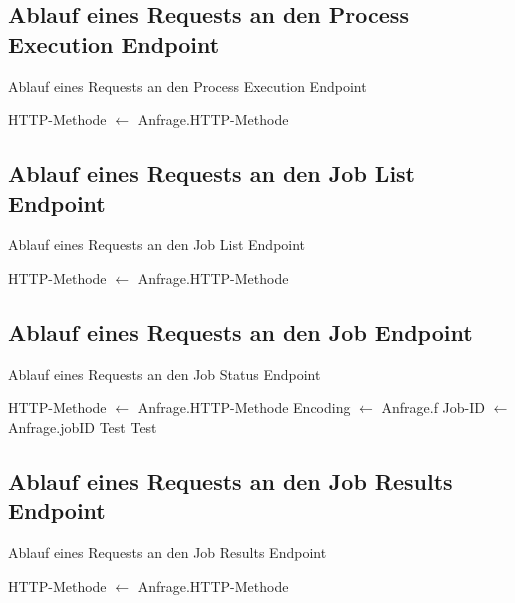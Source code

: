 \subsection{Ablauf eines Requests an den Process Execution Endpoint}
\begin{algorithm}[H]
\caption{Ablauf eines Requests an den Process Execution Endpoint}\label{PseudocodeProcessExecution}
\scriptsize
\begin{algorithmic}  
    \STATE HTTP-Methode $\gets$ Anfrage.HTTP-Methode       
\end{algorithmic}
\end{algorithm}

\subsection{Ablauf eines Requests an den Job List Endpoint}
\begin{algorithm}[H]
\scriptsize
\caption{Ablauf eines Requests an den Job List Endpoint}\label{PseudocodeJobList}
\begin{algorithmic}     
    \STATE HTTP-Methode $\gets$ Anfrage.HTTP-Methode
\end{algorithmic}
\end{algorithm}

\subsection{Ablauf eines Requests an den Job Endpoint}
\begin{algorithm}[H]
\scriptsize
\caption{Ablauf eines Requests an den Job Status Endpoint}\label{PseudocodeJobStatus}
\begin{algorithmic}     
    \STATE HTTP-Methode $\gets$ Anfrage.HTTP-Methode
    \STATE Encoding $\gets$ Anfrage.f
    \STATE Job-ID $\gets$ Anfrage.jobID
        \STATE Test
        \STATE Test
    \ELSE{}
    \ENDIF{}
\end{algorithmic}
\end{algorithm}

\subsection{Ablauf eines Requests an den Job Results Endpoint}
\begin{algorithm}[H]
\scriptsize
\caption{Ablauf eines Requests an den Job Results Endpoint}\label{PseudocodeJobResults}
\begin{algorithmic}     
    \STATE HTTP-Methode $\gets$ Anfrage.HTTP-Methode

\end{algorithmic}
\end{algorithm}

